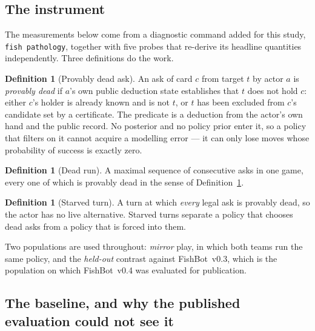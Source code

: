 \documentclass[11pt]{article}
\theoremstyle{definition}
\newtheorem{definition}[theorem]{Definition}
\DeclareRobustCommand{\vfour}{\texorpdfstring{\mbox{FishBot v0.4}}{FishBot v0.4}}
\DeclareRobustCommand{\vthree}{\texorpdfstring{\mbox{FishBot v0.3}}{FishBot v0.3}}
\begin{document}
\subsection{The instrument}
\label{sec:diag-instrument}

The measurements below come from a diagnostic command added for this study,
\texttt{fish pathology}, together with five probes that re-derive its headline
quantities independently. Three definitions do the work.

\begin{definition}[Provably dead ask]
\label{def:dead}
An ask of card $c$ from target $t$ by actor $a$ is \emph{provably dead} if $a$'s
own public deduction state establishes that $t$ does not hold $c$: either $c$'s
holder is already known and is not $t$, or $t$ has been excluded from $c$'s
candidate set by a certificate. The predicate is a deduction from the actor's own
hand and the public record. No posterior and no policy prior enter it, so a
policy that filters on it cannot acquire a modelling error --- it can only lose
moves whose probability of success is exactly zero.
\end{definition}

\begin{definition}[Dead run]
A maximal sequence of consecutive asks in one game, every one of which is
provably dead in the sense of Definition~\ref{def:dead}.
\end{definition}

\begin{definition}[Starved turn]
A turn at which \emph{every} legal ask is provably dead, so the actor has no live
alternative. Starved turns separate a policy that chooses dead asks from a policy
that is forced into them.
\end{definition}

Two populations are used throughout: \emph{mirror} play, in which both teams run
the same policy, and the \emph{held-out} contrast against \vthree{}, which is the
population on which \vfour{} was evaluated for publication.

\subsection{The baseline, and why the published evaluation could not see it}
\label{sec:diag-baseline}
\end{document}
